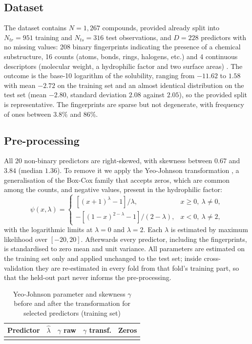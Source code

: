 \documentclass[conference]{IEEEtran}
\begin{document}
\subsection{Dataset}
\label{subsec:dataset}

The dataset contains $N = 1{,}267$ compounds, provided already split
into $N_{tr} = 951$ training and $N_{ts} = 316$ test observations, and
$D = 228$ predictors with no missing values: 208 binary fingerprints
indicating the presence of a chemical substructure, 16 counts (atoms,
bonds, rings, halogens, etc.) and 4 continuous descriptors (molecular
weight, a hydrophilic factor and two surface areas)
\cite{kuhn2013}. The outcome is the base-10 logarithm of the
solubility, ranging from $-11.62$ to $1.58$ with mean $-2.72$ on the
training set and an almost identical distribution on the test set
(mean $-2.80$, standard deviation $2.08$ against $2.05$), so the
provided split is representative. The fingerprints are sparse but not
degenerate, with frequency of ones between $3.8\%$ and $86\%$.

\subsection{Pre-processing}
\label{subsec:preproc}

All 20 non-binary predictors are right-skewed, with skewness between
$0.67$ and $3.84$ (median $1.36$). To remove it we apply the
Yeo-Johnson transformation \cite{yeo2000}, a generalisation of the
Box-Cox family \cite{boxcox1964} that accepts zeros, which are common
among the counts, and negative values, present in the hydrophilic
factor:
\begin{equation}
\psi(x,\lambda)=
\begin{cases}
[(x+1)^{\lambda}-1]/\lambda, & x\ge 0,\ \lambda\neq 0,\\
-[(1-x)^{2-\lambda}-1]/(2-\lambda), & x<0,\ \lambda\neq 2,
\end{cases}
\label{eq:yj}
\end{equation}
with the logarithmic limits at $\lambda=0$ and $\lambda=2$. Each
$\lambda$ is estimated by maximum likelihood over $[-20, 20]$. Afterwards every
predictor, including the fingerprints, is standardised to zero mean and
unit variance. All parameters are estimated on the training set only
and applied unchanged to the test set; inside cross-validation they are
re-estimated in every fold from that fold's training part, so that the
held-out part never informs the pre-processing.

\begin{table}[htbp]
\caption{Yeo-Johnson parameter and skewness $\gamma$ before and after
the transformation for selected predictors (training set)}
\label{tab:skew}
\centering
\begin{tabular}{lrrrr}
\toprule
Predictor & $\hat\lambda$ & $\gamma$ raw & $\gamma$ transf. & Zeros \\
\midrule
\\
\bottomrule
\end{tabular}
\end{table}
\end{document}
